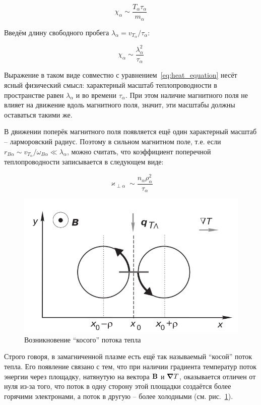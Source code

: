 \documentclass[10pt, a4paper]{article}
\begin{document}
\begin{equation*}
	\chi_\alpha \sim  \frac{T_\alpha \tau_\alpha}{m_\alpha}
\end{equation*}

Введём длину свободного пробега $\lambda_\alpha = v_{T_\alpha} / \tau_\alpha$:

\begin{equation*}
	\chi_\alpha \sim \frac{\lambda_\alpha^2}{\tau_\alpha}
\end{equation*}

Выражение в таком виде совместно с уравнением~\eqref{eq:heat_equation} несёт ясный физический смысл: характерный масштаб теплопроводности в пространстве равен $\lambda_\alpha$ и во времени $\tau_\alpha$. При этом наличие магнитного поля не влияет на движение вдоль магнитного поля, значит, эти масштабы должны оставаться такими же.

В движении поперёк магнитного поля появляется ещё один характерный масштаб -- ларморовский радиус. Поэтому в сильном магнитном поле, т.е. если $r_{B\alpha} \sim v_{T_\alpha} / \omega_{B\alpha} \ll \lambda_\alpha$, можно считать, что коэффициент поперечной теплопроводности записывается в следующем виде:

\begin{equation*}
	\varkappa_{\perp\alpha} \sim \frac{n_\alpha \rho_\alpha^2}{\tau_\alpha}
\end{equation*}

\begin{figure}[ht]
	\begin{center}
		\includegraphics[width=0.5\linewidth]{5.slanted.png}
	\end{center}
    \caption{Возникновение ``косого'' потока тепла~\cite{kotelnikov}}
    \label{fig:oblique_heat_flow} 
\end{figure}

Строго говоря, в замагниченной плазме есть ещё так называемый ``косой'' поток тепла. Его появление связано с тем, что при наличии градиента температур поток энергии через площадку, натянутую на вектора $\vb{B}$ и $\grad T$, оказывается отличен от нуля из-за того, что поток в одну сторону этой площадки создаётся более горячими электронами, а поток в другую -- более холодными (см. рис.~\ref{fig:oblique_heat_flow}).
\end{document}
